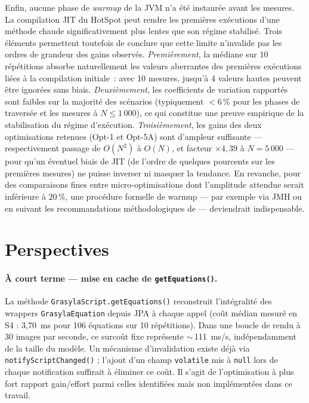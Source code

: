 Enfin, aucune phase de \textit{warmup} de la JVM n'a été instaurée avant les mesures. La compilation JIT du HotSpot peut rendre les premières exécutions d'une méthode chaude significativement plus lentes que son régime stabilisé. Trois éléments permettent toutefois de conclure que cette limite n'invalide pas les ordres de grandeur des gains observés. \emph{Premièrement}, la médiane sur 10 répétitions absorbe naturellement les valeurs aberrantes des premières exécutions liées à la compilation initiale~: avec 10 mesures, jusqu'à 4 valeurs hautes peuvent être ignorées sans biais. \emph{Deuxièmement}, les coefficients de variation rapportés sont faibles sur la majorité des scénarios (typiquement $< 6\,\%$ pour les phases de traversée et les mesures à $N \leq 1\,000$), ce qui constitue une preuve empirique de la stabilisation du régime d'exécution. \emph{Troisièmement}, les gains des deux optimisations retenues (Opt-1 et Opt-5A) sont d'ampleur suffisante --- respectivement passage de $O(N^2)$ à $O(N)$, et facteur $\times 4{,}39$ à $N = 5\,000$ --- pour qu'un éventuel biais de JIT (de l'ordre de quelques pourcents sur les premières mesures) ne puisse inverser ni masquer la tendance. En revanche, pour des comparaisons fines entre micro-optimisations dont l'amplitude attendue serait inférieure à $20\,\%$, une procédure formelle de warmup --- par exemple via JMH ou en suivant les recommandations méthodologiques de \cite{georges2007statistically} --- deviendrait indispensable.

\section{Perspectives}

\paragraph{À court terme — mise en cache de \texttt{getEquations()}.}
La méthode \texttt{GrasylaScript.getEquations()} reconstruit l'intégralité des wrappers \texttt{GrasylaEquation} depuis JPA à chaque appel (coût médian mesuré en S4 : 3,70~ms pour 106 équations sur 10 répétitions). Dans une boucle de rendu à 30 images par seconde, ce surcoût fixe représente $\sim$\,111~ms/s, indépendamment de la taille du modèle. Un mécanisme d'invalidation existe déjà via \texttt{notifyScriptChanged()} ; l'ajout d'un champ \texttt{volatile} mis à \texttt{null} lors de chaque notification suffirait à éliminer ce coût. Il s'agit de l'optimisation à plus fort rapport gain/effort parmi celles identifiées mais non implémentées dans ce travail.

